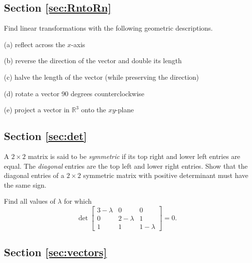 \documentclass[svgnames]{watsonbook}
\begin{document}
\newpage 

\subsection*{Section \ref{sec:RntoRn}}

\begin{exercise}{}{}
Find linear transformations with the following geometric
descriptions. 

(a) reflect across the $x$-axis

(b) reverse the direction of the vector and double its length

(c) halve the length of the vector (while preserving the direction)

(d) rotate a vector 90 degrees counterclockwise

(e) project a vector in $\mathbb{R}^3$ onto the $xy$-plane
\end{exercise}

\subsection*{Section \ref{sec:det}}

\begin{exercise}{}{}
  A $2\times 2$ matrix is said to be \textit{symmetric} if its top
  right and lower left entries are equal. The \textit{diagonal}
  entries are the top left and lower right entries. Show that the
  diagonal entries of a $2\times 2$
  symmetric matrix with positive determinant must have the same sign. 
\end{exercise}

\begin{exercise}{}{}
  Find all values of $\lambda$ for which 
\[
\det \left[
\begin{array}{ccc}
3 - \lambda & 0 & 0 \\
0 & 2-\lambda & 1 \\
1 & 1 & 1 - \lambda
\end{array}
\right]
= 0. 
\]
\end{exercise}

\newpage 

\subsection*{Section \ref{sec:vectors}}
\end{document}
